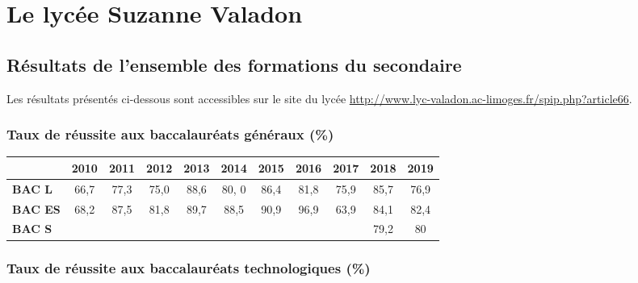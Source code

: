 \documentclass[12pt,a4paper, fleqn]{report}
\begin{document}
\newpage


\newpage
\appendix

\chapter{Le lycée Suzanne Valadon}

\section{Résultats de l'ensemble des formations du secondaire}
\label{ann:resultats}

Les résultats présentés ci-dessous sont accessibles sur le site du lycée \href{http://www.lyc-valadon.ac-limoges.fr/spip.php?article66}{http://www.lyc-valadon.ac-limoges.fr/spip.php?article66}.

\subsection{Taux de réussite aux baccalauréats généraux (\%)}

\begin{center}
\begin{tabular}{l|c|c|c|c|c|c|c|c|c|c}
		& \textbf{2010} & \textbf{2011} & \textbf{2012} & \textbf{2013} & \textbf{2014} & \textbf{2015} & \textbf{2016} & \textbf{2017} & \textbf{2018} & \textbf{2019} \\
\hline \hline
\textbf{BAC L} 		& 66{,}7 & 77{,}3 & 75{,}0 & 88{,}6 & 80{,} 0 & 86{,}4 & 81{,}8 & 75{,}9 & 85{,}7 & 76{,}9 \\
\hline
\textbf{BAC ES} 	& 68{,}2 & 87{,}5 & 81{,}8 & 89{,}7 & 88{,}5 & 90{,}9 & 96{,}9 & 63{,}9 & 84{,}1 & 82{,}4 \\
\hline
\textbf{BAC S}		& & & & & & & & & 79{,}2 & 80 \\
\end{tabular}
\end{center}

\subsection{Taux de réussite aux baccalauréats technologiques (\%)}
\end{document}

